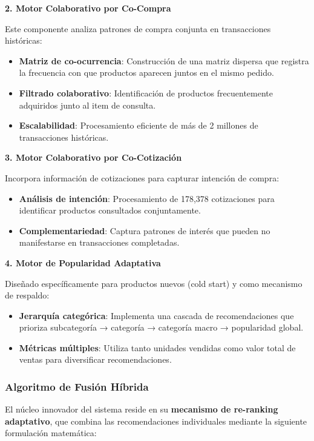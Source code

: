 \documentclass[twocolumn]{article}
\begin{document}
\textbf{2. Motor Colaborativo por Co-Compra}

Este componente analiza patrones de compra conjunta en transacciones históricas:

\begin{itemize}
    \item \textbf{Matriz de co-ocurrencia}: Construcción de una matriz dispersa que registra la frecuencia con que productos aparecen juntos en el mismo pedido.
    \item \textbf{Filtrado colaborativo}: Identificación de productos frecuentemente adquiridos junto al item de consulta.
    \item \textbf{Escalabilidad}: Procesamiento eficiente de más de 2 millones de transacciones históricas.
\end{itemize}

\textbf{3. Motor Colaborativo por Co-Cotización}

Incorpora información de cotizaciones para capturar intención de compra:

\begin{itemize}
    \item \textbf{Análisis de intención}: Procesamiento de 178,378 cotizaciones para identificar productos consultados conjuntamente.
    \item \textbf{Complementariedad}: Captura patrones de interés que pueden no manifestarse en transacciones completadas.
\end{itemize}

\textbf{4. Motor de Popularidad Adaptativa}

Diseñado específicamente para productos nuevos (cold start) y como mecanismo de respaldo:

\begin{itemize}
    \item \textbf{Jerarquía categórica}: Implementa una cascada de recomendaciones que prioriza subcategoría → categoría → categoría macro → popularidad global.
    \item \textbf{Métricas múltiples}: Utiliza tanto unidades vendidas como valor total de ventas para diversificar recomendaciones.
\end{itemize}

\subsubsection{Algoritmo de Fusión Híbrida}

El núcleo innovador del sistema reside en su \textbf{mecanismo de re-ranking adaptativo}, que combina las recomendaciones individuales mediante la siguiente formulación matemática:
\end{document}
